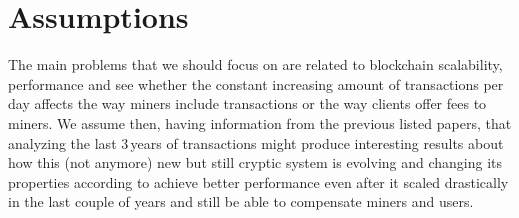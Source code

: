 \section{Assumptions} %
\label{sec:assumptions}
The main problems that we should focus on
are related to blockchain scalability, performance and
see whether the constant increasing amount of transactions
per day affects the way miners include transactions
or the way clients offer fees to miners.
We assume then, having information from the
previous listed papers, that analyzing the last $3$\,years
of transactions might produce interesting
results about how this (not anymore) new but still
cryptic system is evolving and changing its
properties according to achieve better performance
even after it scaled drastically in the last couple of
years
and still be able to compensate miners and users.